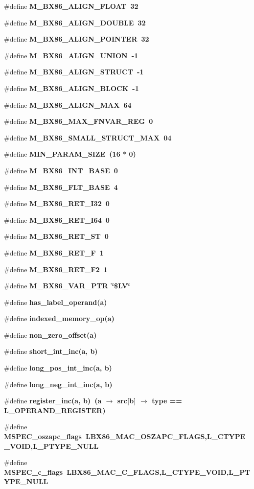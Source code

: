 \begin{CompactItemize}
\item 
\#define \bf{M\_\-BX86\_\-ALIGN\_\-FLOAT}~32
\item 
\#define \bf{M\_\-BX86\_\-ALIGN\_\-DOUBLE}~32
\item 
\#define \bf{M\_\-BX86\_\-ALIGN\_\-POINTER}~32
\item 
\#define \bf{M\_\-BX86\_\-ALIGN\_\-UNION}~-1
\item 
\#define \bf{M\_\-BX86\_\-ALIGN\_\-STRUCT}~-1
\item 
\#define \bf{M\_\-BX86\_\-ALIGN\_\-BLOCK}~-1
\item 
\#define \bf{M\_\-BX86\_\-ALIGN\_\-MAX}~64
\item 
\#define \bf{M\_\-BX86\_\-MAX\_\-FNVAR\_\-REG}~0
\item 
\#define \bf{M\_\-BX86\_\-SMALL\_\-STRUCT\_\-MAX}~04
\item 
\#define \bf{MIN\_\-PARAM\_\-SIZE}~(16 $\ast$ 0)
\item 
\#define \bf{M\_\-BX86\_\-INT\_\-BASE}~0
\item 
\#define \bf{M\_\-BX86\_\-FLT\_\-BASE}~4
\item 
\#define \bf{M\_\-BX86\_\-RET\_\-I32}~0
\item 
\#define \bf{M\_\-BX86\_\-RET\_\-I64}~0
\item 
\#define \bf{M\_\-BX86\_\-RET\_\-ST}~0
\item 
\#define \bf{M\_\-BX86\_\-RET\_\-F}~1
\item 
\#define \bf{M\_\-BX86\_\-RET\_\-F2}~1
\item 
\#define \bf{M\_\-BX86\_\-VAR\_\-PTR}~\char`\"{}\$LV\char`\"{}
\item 
\#define \bf{has\_\-label\_\-operand}(a)
\item 
\#define \bf{indexed\_\-memory\_\-op}(a)
\item 
\#define \bf{non\_\-zero\_\-offset}(a)
\item 
\#define \bf{short\_\-int\_\-inc}(a, b)
\item 
\#define \bf{long\_\-pos\_\-int\_\-inc}(a, b)
\item 
\#define \bf{long\_\-neg\_\-int\_\-inc}(a, b)
\item 
\#define \bf{register\_\-inc}(a, b)~(a $\rightarrow$ src[b] $\rightarrow$ type == L\_\-OPERAND\_\-REGISTER)
\item 
\#define \bf{MSPEC\_\-oszapc\_\-flags}~LBX86\_\-MAC\_\-OSZAPC\_\-FLAGS,L\_\-CTYPE\_\-VOID,L\_\-PTYPE\_\-NULL
\item 
\#define \bf{MSPEC\_\-c\_\-flags}~LBX86\_\-MAC\_\-C\_\-FLAGS,L\_\-CTYPE\_\-VOID,L\_\-PTYPE\_\-NULL

\end{CompactItemize}
